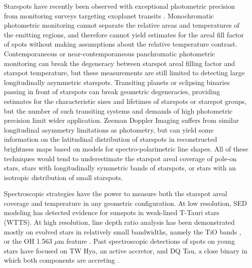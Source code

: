 \documentclass[twocolumn]{emulateapj}%
\begin{document}


Starspots have recently been observed with exceptional photometric precision from monitoring surveys targeting exoplanet transits \citep[\emph{e.g}][]{harrison11,davenport15}.  Monochromatic photometric monitoring cannot separate the relative areas and temperatures of the emitting regions, and therefore cannot yield estimates for the areal fill factor of spots without making assumptions about the relative temperature contrast. Contemporaneous or near-contemporaneous panchromatic photometric monitoring \citep{petrov94,bouvier95,grankin07,cody14} can break the degeneracy between starspot areal filling factor and starspot temperature, but these measurements are still limited to detecting large longitudinally asymmetric starspots.  Transiting planets or eclipsing binaries passing in front of starspots \citep{desert11} can break geometric degeneracies, providing estimates for the characteristic sizes and lifetimes of starspots or starspot groups, but the number of such transiting systems and demands of high photometric precision limit wider application.  Zeeman Doppler Imaging \citep[ZDI]{donati14} suffers from similar longitudinal asymmetry limitations as photometry, but can yield some information on the latitudinal distribution of starspots in reconstructed brightness maps based on models for spectro-polarimetric line shapes.  All of these techniques would tend to underestimate the starspot areal coverage of pole-on stars, stars with longitudinally symmetric bands of starspots, or stars with an isotropic distribution of small starspots.  

Spectroscopic strategies have the power to measure both the starspot areal coverage and temperature in any geometric configuration.  At low resolution, SED modeling \citep{wolk96} has detected evidence for sunspots in weak-lined T-Tauri stars (WTTS).  At high resolution, line depth ratio analysis has been demonstrated mostly on evolved stars in relatively small bandwidths, namely the TiO bands \citep{neff95,oneal96,oneal98,oneal04}, or the OH 1.563 $\mu$m feature \citep{oneal01}.  Past spectroscopic detections of spots on young stars have focused on TW Hya, an active accretor, and DQ Tau, a close binary in which both components are accreting \citep{debes13,bary14}.  
\end{document}
